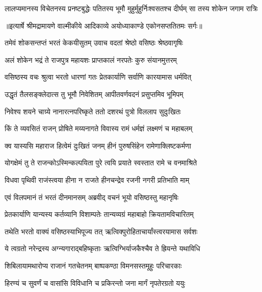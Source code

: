\fourlineindentedshloka
{लालप्यमानस्य विचेतनस्य}
{प्रनष्टबुद्धेः पतितस्य भूमौ}
{मुहुर्मुहुर्निःश्वसतश्च दीर्घम्}
{सा तस्य शोकेन जगाम रात्रिः} %


{॥इत्यार्षे श्रीमद्रामायणे वाल्मीकीये आदिकाव्ये अयोध्याकाण्डे एकोनसप्ततितमः सर्गः॥}


\twolineshloka
{तमेवं शोकसन्तप्तं भरतं केकयीसुतम्}
{उवाच वदतां श्रेष्ठो वसिष्ठः श्रेष्ठवागृषिः} %

\twolineshloka
{अलं शोकेन भद्रं ते राजपुत्र महायशः}
{प्राप्तकालं नरपतेः कुरु संयानमुत्तरम्} %

\twolineshloka
{वसिष्ठस्य वचः श्रुत्वा भरतो धारणां गतः}
{प्रेतकार्याणि सर्वाणि कारयामास धर्मवित्} %

\twolineshloka
{उद्धृतं तैलसङ्क्लेदात्स तु भूमौ निवेशितम्}
{आपीतवर्णवदनं प्रसुप्तमिव भूमिपम्} %

\twolineshloka
{निवेश्य शयने चाग्र्ये नानारत्नपरिष्कृते}
{ततो दशरथं पुत्रो विललाप सुदुःखितः} %

\twolineshloka
{किं ते व्यवसितं राजन् प्रोषिते मय्यनागते}
{विवास्य रामं धर्मज्ञं लक्ष्मणं च महाबलम्} %

\twolineshloka
{क्व यास्यसि महाराज हित्वेमं दुःखितं जनम्}
{हीनं पुरुषसिंहेन रामेणाक्लिष्टकर्मणा} %

\twolineshloka
{योगक्षेमं तु ते राजन्कोऽस्मिन्कल्पयिता पुरे}
{त्वयि प्रयाते स्वस्तात रामे च वनमाश्रिते} %

\twolineshloka
{विधवा पृथिवी राजंस्त्वया हीना न राजते}
{हीनचन्द्रेव रजनी नगरी प्रतिभाति माम्} %

\twolineshloka
{एवं विलपमानं तं भरतं दीनमानसम्}
{अब्रवीद् वचनं भूयो वसिष्ठस्तु महानृषिः} %

\twolineshloka
{प्रेतकार्याणि यान्यस्य कर्तव्यानि विशाम्पतेः}
{तान्यव्यग्रं महाबाहो क्रियतामविचारितम्} %

\twolineshloka
{तथेति भरतो वाक्यं वसिष्ठस्याभिपूज्य तत्}
{ऋत्विक्पुरोहिताचार्यांस्त्वरयामास सर्वशः} %

\twolineshloka
{ये त्वग्रतो नरेन्द्रस्य अग्न्यगाराद्बहिष्कृताः}
{ऋत्विग्भिर्याजकैश्चैव ते ह्रियन्ते यथाविधि} %

\twolineshloka
{शिबिलायामथारोप्य राजानं गतचेतनम्}
{बाष्पकण्ठा विमनसस्तमूहुः परिचारकाः} %

\twolineshloka
{हिरण्यं च सुवर्णं च वासांसि विविधानि च}
{प्रकिरन्तो जना मार्गं नृपतेरग्रतो ययुः} %

